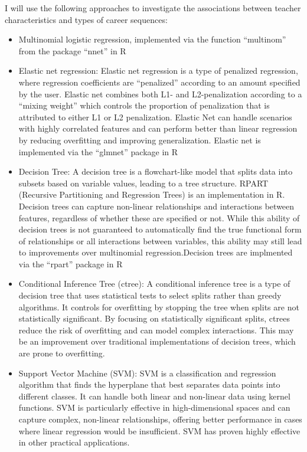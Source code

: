 \documentclass[
]{article}
\begin{document}
I will use the following approaches to investigate the associations between teacher characteristics and types of career sequences:

\begin{itemize}
\item
  Multinomial logistic regression, implemented via the function ``multinom'' from the package ``nnet'' in R
\item
  Elastic net regression: Elastic net regression is a type of penalized regression, where regression coefficients are ``penalized'' according to an amount specified by the user. Elastic net combines both L1- and L2-penalization according to a ``mixing weight'' which controls the proportion of penalization that is attributed to either L1 or L2 penalization. Elastic Net can handle scenarios with highly correlated features and can perform better than linear regression by reducing overfitting and improving generalization. Elastic net is implemented via the ``glmnet'' package in R
\item
  Decision Tree:
  A decision tree is a flowchart-like model that splits data into subsets based on variable values, leading to a tree structure. RPART (Recursive Partitioning and Regression Trees) is an implementation in R.
  Decision trees can capture non-linear relationships and interactions between features, regardless of whether these are specified or not. While this ability of decision trees is not guaranteed to automatically find the true functional form of relationships or all interactions between variables, this ability may still lead to improvements over multinomial regression.Decision trees are implmented via the ``rpart'' package in R
\item
  Conditional Inference Tree (ctree):
  A conditional inference tree is a type of decision tree that uses statistical tests to select splits rather than greedy algorithms. It controls for overfitting by stopping the tree when splits are not statistically significant.
  By focusing on statistically significant splits, ctrees reduce the risk of overfitting and can model complex interactions. This may be an improvement over traditional implementations of decision trees, which are prone to overfitting.
\item
  Support Vector Machine (SVM):
  SVM is a classification and regression algorithm that finds the hyperplane that best separates data points into different classes. It can handle both linear and non-linear data using kernel functions.
  SVM is particularly effective in high-dimensional spaces and can capture complex, non-linear relationships, offering better performance in cases where linear regression would be insufficient. SVM has proven highly effective in other practical applications.

\end{itemize}
\end{document}
